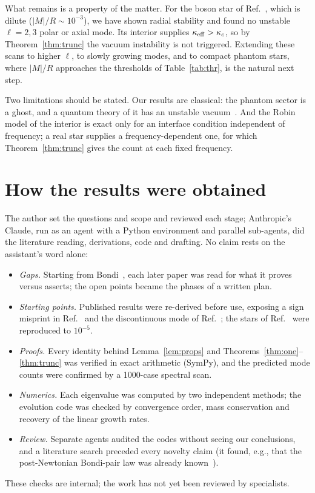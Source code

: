 \documentclass[11pt]{article}
\theoremstyle{remark}
\begin{document}
What remains is a property of the matter. For the boson star of Ref.~\cite{Shirokov2026}, which is dilute
($|M|/R\sim10^{-3}$), we have shown radial stability and found no unstable $\ell=2,3$ polar or axial mode. Its interior
supplies $\kappa_{\rm eff}>\kappa_c$, so by Theorem~\ref{thm:trunc} the vacuum instability is not triggered. Extending
these scans to higher $\ell$, to slowly growing modes, and to compact phantom stars, where $|M|/R$ approaches the
thresholds of Table~\ref{tab:thr}, is the natural next step.

Two limitations should be stated. Our results are classical: the phantom sector is a ghost, and a quantum theory of it
has an unstable vacuum~\cite{CJM2004}. And the Robin model of the interior is exact only for an interface condition
independent of frequency; a real star supplies a frequency-dependent one, for which Theorem~\ref{thm:trunc} gives the
count at each fixed frequency.

\section{How the results were obtained}\label{sec:method}

The author set the questions and scope and reviewed each stage; Anthropic's Claude, run as an agent with a Python
environment and parallel sub-agents, did the literature reading, derivations, code and drafting. No claim rests on
the assistant's word alone:
\begin{itemize}
\item \emph{Gaps.} Starting from Bondi~\cite{Bondi1957}, each later paper was read for what it proves versus asserts;
the open points became the phases of a written plan.
\item \emph{Starting points.} Published results were re-derived before use, exposing a sign misprint in
Ref.~\cite{DG2009} and the discontinuous mode of Ref.~\cite{GHI2005}; the stars of Ref.~\cite{Shirokov2026} were
reproduced to $10^{-5}$.
\item \emph{Proofs.} Every identity behind Lemma~\ref{lem:props} and Theorems~\ref{thm:one}--\ref{thm:trunc} was verified
in exact arithmetic (SymPy), and the predicted mode counts were confirmed by a 1000-case spectral scan.
\item \emph{Numerics.} Each eigenvalue was computed by two independent methods; the evolution code was checked by
convergence order, mass conservation and recovery of the linear growth rates.
\item \emph{Review.} Separate agents audited the codes without seeing our conclusions, and a literature search preceded
every novelty claim (it found, e.g., that the post-Newtonian Bondi-pair law was already known~\cite{Ivanov2012}).
\end{itemize}
These checks are internal; the work has not yet been reviewed by specialists.
\end{document}
